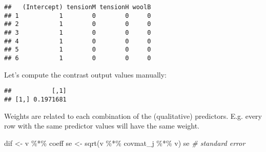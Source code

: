 \documentclass[
  oneside]{book}
\newenvironment{Shaded}{\begin{snugshade}}{\end{snugshade}}
\newcommand{\CommentTok}[1]{\textcolor[rgb]{0.56,0.35,0.01}{\textit{#1}}}
\newcommand{\DecValTok}[1]{\textcolor[rgb]{0.00,0.00,0.81}{#1}}
\newcommand{\FunctionTok}[1]{\textcolor[rgb]{0.00,0.00,0.00}{#1}}
\newcommand{\NormalTok}[1]{#1}
\newcommand{\OtherTok}[1]{\textcolor[rgb]{0.56,0.35,0.01}{#1}}
\newcommand{\SpecialCharTok}[1]{\textcolor[rgb]{0.00,0.00,0.00}{#1}}
\begin{document}
\begin{verbatim}
##   (Intercept) tensionM tensionH woolB
## 1           1        0        0     0
## 2           1        0        0     0
## 3           1        0        0     0
## 4           1        0        0     0
## 5           1        0        0     0
## 6           1        0        0     0
\end{verbatim}

Let's compute the contrast output values manually:

\begin{Shaded}
\end{Shaded}

\begin{verbatim}
##           [,1]
## [1,] 0.1971681
\end{verbatim}

\begin{Shaded}
\end{Shaded}

Weights are related to each combination of the (qualitative)
predictors. E.g. every row with the same predictor values will have
the same weight.

\begin{Shaded}
\begin{Highlighting}[]
\NormalTok{dif }\OtherTok{\textless{}{-}}\NormalTok{ v }\SpecialCharTok{\%*\%}\NormalTok{ coeff}
\NormalTok{se }\OtherTok{\textless{}{-}} \FunctionTok{sqrt}\NormalTok{(v }\SpecialCharTok{\%*\%}\NormalTok{ covmat\_j }\SpecialCharTok{\%*\%}\NormalTok{ v)}
\NormalTok{se }\CommentTok{\# standard error}
\end{Highlighting}
\end{Shaded}
\end{document}
